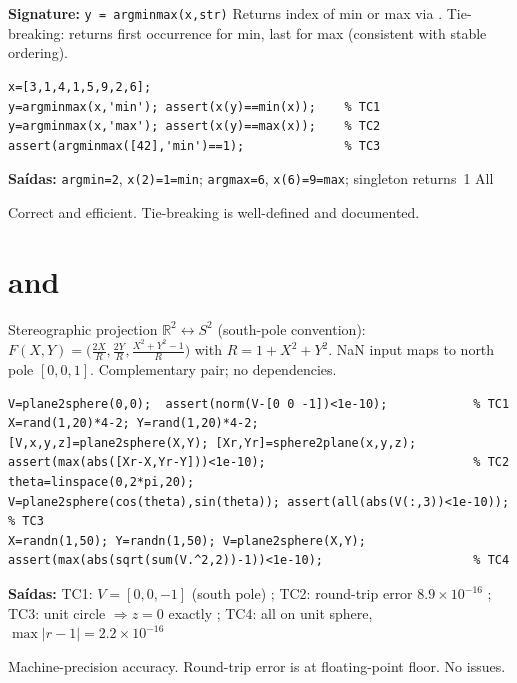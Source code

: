 \chapter{}
\begin{tcolorbox}[Abox,title={Analysis}]
\textbf{Signature:} \lstinline|y = argminmax(x,str)|\quad
Returns index of min or max via . Tie-breaking: returns first occurrence for min, last for max (consistent with  stable ordering).
\end{tcolorbox}
\begin{lstlisting}[caption={Tests for argminmax.m}]
x=[3,1,4,1,5,9,2,6];
y=argminmax(x,'min'); assert(x(y)==min(x));    % TC1
y=argminmax(x,'max'); assert(x(y)==max(x));    % TC2
assert(argminmax([42],'min')==1);              % TC3
\end{lstlisting}
\begin{tcolorbox}[Pbox,title={TC1--TC3 -- All pass}]
\textbf{Saídas:} \texttt{argmin=2}, \texttt{x(2)=1=min}; \texttt{argmax=6}, \texttt{x(6)=9=max}; singleton returns~1 \quad All \APROVADO
\end{tcolorbox}
\begin{concl}
Correct and efficient. Tie-breaking is well-defined and documented.
\end{concl}

\chapter{ and }
\begin{tcolorbox}[Abox,title={Analysis}]
Stereographic projection $\mathbb{R}^2\leftrightarrow S^2$ (south-pole convention):
$F(X,Y)=\bigl(\frac{2X}{R},\frac{2Y}{R},\frac{X^2+Y^2-1}{R}\bigr)$ with $R=1+X^2+Y^2$.
NaN input maps to north pole $[0,0,1]$. Complementary pair; no dependencies.
\end{tcolorbox}
\begin{lstlisting}[caption={Tests for plane2sphere.m / sphere2plane.m}]
V=plane2sphere(0,0);  assert(norm(V-[0 0 -1])<1e-10);            % TC1
X=rand(1,20)*4-2; Y=rand(1,20)*4-2;
[V,x,y,z]=plane2sphere(X,Y); [Xr,Yr]=sphere2plane(x,y,z);
assert(max(abs([Xr-X,Yr-Y]))<1e-10);                             % TC2
theta=linspace(0,2*pi,20);
V=plane2sphere(cos(theta),sin(theta)); assert(all(abs(V(:,3))<1e-10)); % TC3
X=randn(1,50); Y=randn(1,50); V=plane2sphere(X,Y);
assert(max(abs(sqrt(sum(V.^2,2))-1))<1e-10);                     % TC4
\end{lstlisting}
\begin{tcolorbox}[Pbox,title={TC1--TC4 -- All pass}]
\textbf{Saídas:}
TC1: $V=[0,0,-1]$ (south pole) \APROVADO; TC2: round-trip error $8.9\times10^{-16}$ \APROVADO;
TC3: unit circle $\Rightarrow z=0$ exactly \APROVADO; TC4: all on unit sphere, $\max|r-1|=2.2\times10^{-16}$ \APROVADO
\end{tcolorbox}
\begin{concl}
Machine-precision accuracy. Round-trip error is at floating-point floor. No issues.
\end{concl}

